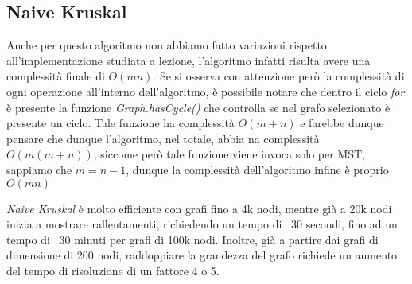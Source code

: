\subsection{Naive Kruskal}
Anche per questo algoritmo non abbiamo fatto variazioni rispetto all'implementazione studiata a lezione, l'algoritmo infatti risulta avere una complessità finale di $O(mn)$. Se si osserva con attenzione però la complessità di ogni operazione all'interno dell'algoritmo, è possibile notare che dentro il ciclo \textit{for} è presente la funzione \textit{Graph.hasCycle()} che controlla se nel grafo selezionato è presente un ciclo. Tale funzione ha complessità $O(m+n)$ e farebbe dunque pensare che dunque l'algoritmo, nel totale, abbia na complessità $O(m(m+n))$; siccome però tale funzione viene invoca solo per MST, sappiamo che $m=n-1$, dunque la complessità dell'algoritmo infine è proprio $O(mn)$


\textit{Naive Kruskal} è molto efficiente con grafi fino a 4k nodi, mentre già a 20k nodi inizia a mostrare rallentamenti, richiedendo un tempo di ~30 secondi, fino ad un tempo di ~30 minuti per grafi di 100k nodi.
Inoltre, già a partire dai grafi di dimensione di 200 nodi, raddoppiare la grandezza del grafo richiede un aumento del tempo di risoluzione di un fattore 4 o 5.

